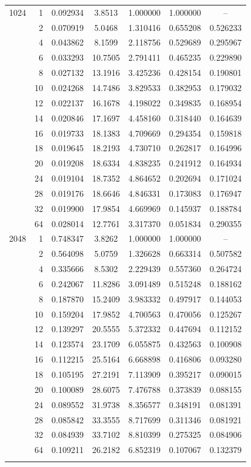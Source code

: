 \begin{longtable}{rrccccc}
1024 & 1 & 0.092934 & 3.8513 & 1.000000 & 1.000000 & -- \\
 & 2 & 0.070919 & 5.0468 & 1.310416 & 0.655208 & 0.526233 \\
 & 4 & 0.043862 & 8.1599 & 2.118756 & 0.529689 & 0.295967 \\
 & 6 & 0.033293 & 10.7505 & 2.791411 & 0.465235 & 0.229890 \\
 & 8 & 0.027132 & 13.1916 & 3.425236 & 0.428154 & 0.190801 \\
 & 10 & 0.024268 & 14.7486 & 3.829533 & 0.382953 & 0.179032 \\
 & 12 & 0.022137 & 16.1678 & 4.198022 & 0.349835 & 0.168954 \\
 & 14 & 0.020846 & 17.1697 & 4.458160 & 0.318440 & 0.164639 \\
 & 16 & 0.019733 & 18.1383 & 4.709669 & 0.294354 & 0.159818 \\
 & 18 & 0.019645 & 18.2193 & 4.730710 & 0.262817 & 0.164996 \\
 & 20 & 0.019208 & 18.6334 & 4.838235 & 0.241912 & 0.164934 \\
 & 24 & 0.019104 & 18.7352 & 4.864652 & 0.202694 & 0.171024 \\
 & 28 & 0.019176 & 18.6646 & 4.846331 & 0.173083 & 0.176947 \\
 & 32 & 0.019900 & 17.9854 & 4.669969 & 0.145937 & 0.188784 \\
 & 64 & 0.028014 & 12.7761 & 3.317370 & 0.051834 & 0.290355 \\
2048 & 1 & 0.748347 & 3.8262 & 1.000000 & 1.000000 & -- \\
 & 2 & 0.564098 & 5.0759 & 1.326628 & 0.663314 & 0.507582 \\
 & 4 & 0.335666 & 8.5302 & 2.229439 & 0.557360 & 0.264724 \\
 & 6 & 0.242067 & 11.8286 & 3.091489 & 0.515248 & 0.188162 \\
 & 8 & 0.187870 & 15.2409 & 3.983332 & 0.497917 & 0.144053 \\
 & 10 & 0.159204 & 17.9852 & 4.700563 & 0.470056 & 0.125267 \\
 & 12 & 0.139297 & 20.5555 & 5.372332 & 0.447694 & 0.112152 \\
 & 14 & 0.123574 & 23.1709 & 6.055875 & 0.432563 & 0.100908 \\
 & 16 & 0.112215 & 25.5164 & 6.668898 & 0.416806 & 0.093280 \\
 & 18 & 0.105195 & 27.2191 & 7.113909 & 0.395217 & 0.090015 \\
 & 20 & 0.100089 & 28.6075 & 7.476788 & 0.373839 & 0.088155 \\
 & 24 & 0.089552 & 31.9738 & 8.356577 & 0.348191 & 0.081391 \\
 & 28 & 0.085842 & 33.3555 & 8.717699 & 0.311346 & 0.081921 \\
 & 32 & 0.084939 & 33.7102 & 8.810399 & 0.275325 & 0.084906 \\
 & 64 & 0.109211 & 26.2182 & 6.852319 & 0.107067 & 0.132379 \\
\bottomrule
\label{tab:v3_openmp_thread_scaling_extended}
\end{longtable}

